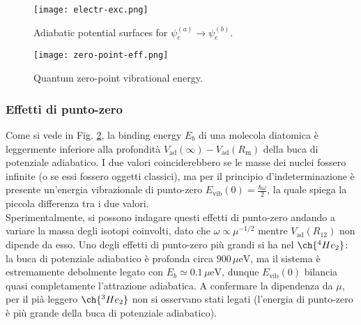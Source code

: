 \begin{figure}
	\centering
	\texttt{[image: electr-exc.png]}
	\caption{Adiabatic potential surfaces for $ \psi_e^{(a)} \rightarrow \psi_e^{(b)} $.}
	\label{elec-ex}
\end{figure}
\begin{figure}
	\centering
	\texttt{[image: zero-point-eff.png]}
	\caption{Quantum zero-point vibrational energy.}
	\label{zero-p}
\end{figure}

\subsubsection{Effetti di punto-zero}

Come si vede in Fig. \ref{zero-p}, la binding energy $ E_b $ di una molecola diatomica è leggermente inferiore alla profondità $ V_\text{ad}(\infty) - V_\text{ad}(R_\text{m}) $ della buca di potenziale adiabatico. I due valori coinciderebbero se le masse dei nuclei fossero infinite (o se essi fossero oggetti classici), ma per il principio d'indeterminazione è presente un'energia vibrazionale di punto-zero $ E_\text{vib}(0) = \frac{\hbar \omega}{2} $, la quale spiega la piccola differenza tra i due valori. \\
Sperimentalmente, si possono indagare questi effetti di punto-zero andando a variare la massa degli isotopi coinvolti, dato che $ \omega \propto \mu^{-1/2} $ mentre $ V_\text{ad}(R_{12}) $ non dipende da esso. Uno degli effetti di punto-zero più grandi si ha nel $ \ch{^4He_2} $: la buca di potenziale adiabatico è profonda circa $ 900 \,\mu\text{eV} $, ma il sistema è estremamente debolmente legato con $ E_b \simeq 0.1 \,\mu\text{eV} $, dunque $ E_\text{vib}(0) $ bilancia quasi completamente l'attrazione adiabatica. A confermare la dipendenza da $ \mu $, per il pià leggero $ \ch{^3He_2} $ non si osservano stati legati (l'energia di punto-zero è più grande della buca di potenziale adiabatico).











